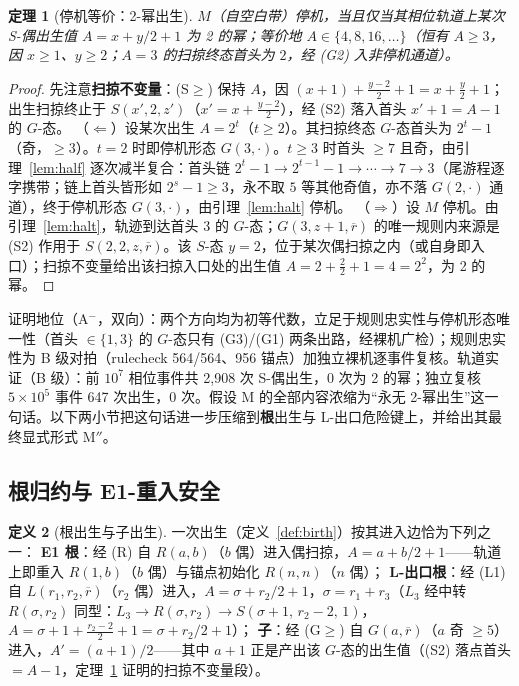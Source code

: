 \documentclass[11pt]{ctexart}
\newtheorem{theorem}{定理}[section]
\theoremstyle{definition}
\newtheorem{definition}[theorem]{定义}
\begin{document}
\begin{theorem}[停机等价：2-幂出生]\label{thm:haltpow}
$M$（自空白带）停机，当且仅当其相位轨道上某次 S-偶出生值 $A=x+y/2+1$ 为 2 的幂；等价地 $A\in\{4,8,16,\dots\}$（恒有 $A\ge3$，因 $x\ge1$、$y\ge2$；$A=3$ 的扫掠终态首头为 $2$，经 (G2) 入非停机通道）。
\end{theorem}
\begin{proof}
先注意\textbf{扫掠不变量}：(S$\ge$) 保持 $A$，因 $(x{+}1)+\frac{y-2}{2}+1=x+\frac y2+1$；出生扫掠终止于 $S(x',2,z')$（$x'=x+\frac{y-2}{2}$），经 (S2) 落入首头 $x'{+}1=A-1$ 的 $G$-态。
（$\Longleftarrow$）设某次出生 $A=2^t$（$t\ge2$）。其扫掠终态 $G$-态首头为 $2^t-1$（奇，$\ge3$）。$t=2$ 时即停机形态 $G(3,\cdot)$。$t\ge3$ 时首头 $\ge7$ 且奇，由引理~\ref{lem:half} 逐次减半复合：首头链 $2^t-1\to2^{t-1}-1\to\cdots\to7\to3$（尾游程逐字携带；链上首头皆形如 $2^s-1\ge3$，永不取 $5$ 等其他奇值，亦不落 $G(2,\cdot)$ 通道），终于停机形态 $G(3,\cdot)$，由引理~\ref{lem:halt} 停机。
（$\Longrightarrow$）设 $M$ 停机。由引理~\ref{lem:halt}，轨迹到达首头 $3$ 的 $G$-态；$G(3,z{+}1,\overline r)$ 的唯一规则内来源是 (S2) 作用于 $S(2,2,z,\overline r)$。该 $S$-态 $y=2$，位于某次偶扫掠之内（或自身即入口）；扫掠不变量给出该扫掠入口处的出生值 $A=2+\frac22+1=4=2^2$，为 2 的幂。
\end{proof}

证明地位（A$^-$，双向）：两个方向均为初等代数，立足于规则忠实性与停机形态唯一性（首头 $\in\{1,3\}$ 的 $G$-态只有 (G3)/(G1) 两条出路，经裸机广检）；规则忠实性为 B 级对拍（rulecheck 564/564、956 锚点）加独立裸机逐事件复核。轨道实证（B 级）：前 $10^7$ 相位事件共 2,908 次 S-偶出生，0 次为 2 的幂；独立复核 $5\times10^5$ 事件 647 次出生，0 次。假设 M 的全部内容浓缩为``永无 2-幂出生''这一句话。以下两小节把这句话进一步压缩到\textbf{根}出生与 L-出口危险键上，并给出其最终显式形式 $\mathrm{M''}$。

\subsection{根归约与 E1-重入安全}

\begin{definition}[根出生与子出生]\label{def:rootbirth}
一次出生（定义~\ref{def:birth}）按其进入边恰为下列之一：
\textbf{E1 根}：经 (R) 自 $R(a,b)$（$b$ 偶）进入偶扫掠，$A=a+b/2+1$——轨道上即重入 $R(1,b)$（$b$ 偶）与锚点初始化 $R(n,n)$（$n$ 偶）；
\textbf{L-出口根}：经 (L1) 自 $L(r_1,r_2,\overline r)$（$r_2$ 偶）进入，$A=\sigma+r_2/2+1$，$\sigma=r_1+r_3$（$L_3$ 经中转 $R(\sigma,r_2)$ 同型：$L_3\to R(\sigma,r_2)\to S(\sigma{+}1,\,r_2{-}2,\,1)$，$A=\sigma+1+\frac{r_2-2}{2}+1=\sigma+r_2/2+1$）；
\textbf{子}：经 (G$\ge$) 自 $G(a,\overline r)$（$a$ 奇 $\ge5$）进入，$A'=(a{+}1)/2$——其中 $a{+}1$ 正是产出该 $G$-态的出生值（(S2) 落点首头 $=A-1$，定理~\ref{thm:haltpow} 证明的扫掠不变量段）。
\end{definition}
\end{document}
